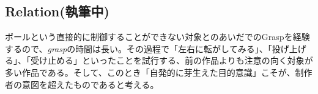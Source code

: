 \subsection*{Relation(執筆中)}
ボールという直接的に制御することができない対象とのあいだでのGraspを経験するので、\textit{grasp}の時間は長い。その過程で「左右に転がしてみる」、「投げ上げる」、「受け止める」といったことを試行する、前の作品よりも注意の向く対象が多い作品である。そして、このとき「自発的に芽生えた目的意識」こそが、制作者の意図を超えたものであると考える。



